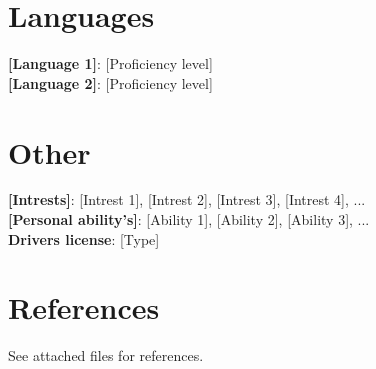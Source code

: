 \documentclass[a4paper,11pt]{article}
\begin{document}
\section{\textbf{Languages}}
 \begin{itemize}[leftmargin=0.05in, label={}]
    \small{\item{
     \textbf{[Language 1]}{: [Proficiency level]} \\
     \textbf{[Language 2]}{: [Proficiency level]} \\
    }}
 \end{itemize}
 \vspace{-8.5pt}

\section{\textbf{Other}}
 \begin{itemize}[leftmargin=0.05in, label={}]
    \small{\item{
     \textbf{[Intrests]}{: [Intrest 1], [Intrest 2], [Intrest 3], [Intrest 4], ...} \\
     \textbf{[Personal ability's]}{: [Ability 1], [Ability 2], [Ability 3], ...} \\
	   \textbf{Drivers license}{: [Type] } \\
    }}
 \end{itemize}
 \vspace{-8.5pt}

\section{\textbf{References}}
See attached files for references.


\end{document}
